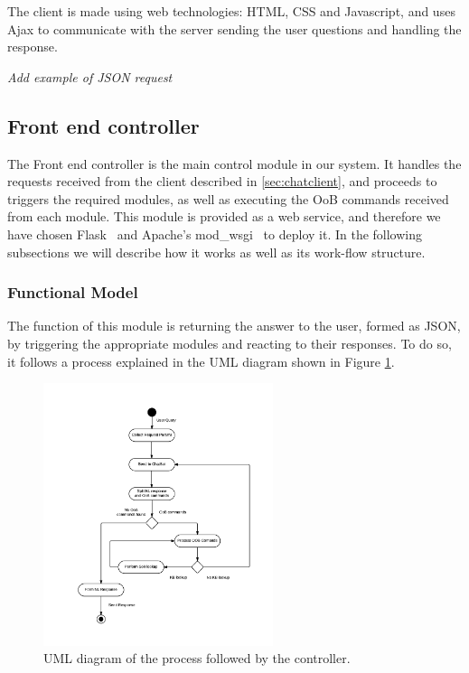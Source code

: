 The client is made using web technologies: HTML, CSS and Javascript, and uses Ajax to communicate with the server sending the user questions and handling the response.

\emph{Add example of JSON request}

\begin{center}
  
\end{center}

\subsection{Front end controller}
\label{sec:frontendcon}
The Front end controller is the main control module in our system. It handles the requests received from the client described in \ref{sec:chatclient}, and proceeds to triggers the required modules, as well as executing the \ac{OoB} commands received from each module. This module is provided as a web service, and therefore we have chosen Flask~\cite{flask0101} and Apache's mod\_wsgi~\cite{modwsgi} to deploy it. In the following subsections we will describe how it works as well as its work-flow structure.

\subsubsection{Functional Model}

The function of this module is returning the answer to the user, formed as JSON, by triggering the appropriate modules and reacting to their responses. To do so, it follows a process explained in the UML diagram shown in Figure \ref{fig:fe-model1}.

\begin{figure}[!htbp]
    \centering
    \includegraphics[width=0.6\textwidth]{img/prot/activityDiagram.png} 
    \caption{UML diagram of the process followed by the controller.}
    \label{fig:fe-model1}
\end{figure}


